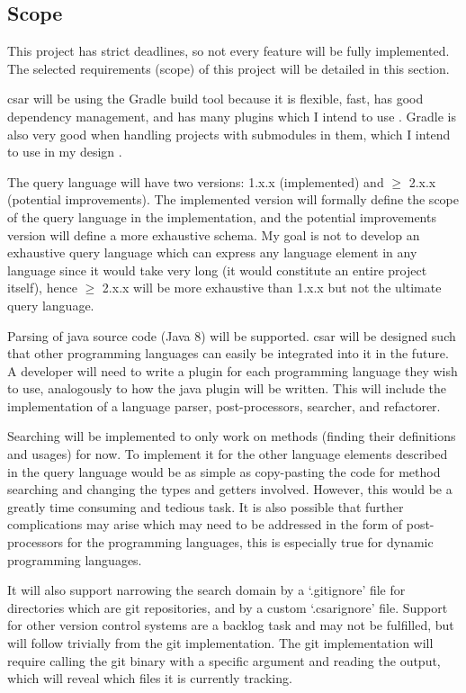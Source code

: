 \documentclass[12pt, letterpaper]{article}
\begin{document}
\subsection{Scope}
This project has strict deadlines, so not every feature will be fully implemented.
The selected requirements (scope) of this project will be detailed in this section.

csar will be using the Gradle build tool because it is flexible, fast, has good dependency management, and has many plugins which I intend to use \autocite{mavenvsgradle}.
Gradle is also very good when handling projects with submodules in them, which I intend to use in my design \autocite{drdobbswhyusegradle}.

The query language will have two versions: 1.x.x (implemented) and $ \geq $ 2.x.x (potential improvements).
The implemented version will formally define the scope of the query language in the implementation, and the potential improvements version will define a more exhaustive schema.
My goal is not to develop an exhaustive query language which can express any language element in any language since it would take very long (it would constitute an entire project itself), hence $ \geq $ 2.x.x will be more exhaustive than 1.x.x but not the ultimate query language.

Parsing of java source code (Java 8) will be supported.
csar will be designed such that other programming languages can easily be integrated into it in the future.
A developer will need to write a plugin for each programming language they wish to use, analogously to how the java plugin will be written.
This will include the implementation of a language parser, post-processors, searcher, and refactorer.

Searching will be implemented to only work on methods (finding their definitions and usages) for now.
To implement it for the other language elements described in the query language would be as simple as copy-pasting the code for method searching and changing the types and getters involved.
However, this would be a greatly time consuming and tedious task.
It is also possible that further complications may arise which may need to be addressed in the form of post-processors for the programming languages, this is especially true for dynamic programming languages.

It will also support narrowing the search domain by a `.gitignore' file for directories which are git repositories, and by a custom `.csarignore' file.
Support for other version control systems are a backlog task and may not be fulfilled, but will follow trivially from the git implementation.
The git implementation will require calling the git binary with a specific argument and reading the output, which will reveal which files it is currently tracking.
\end{document}
